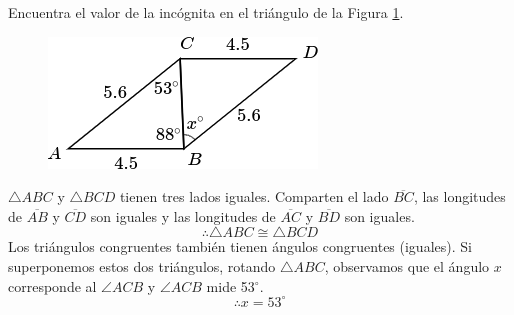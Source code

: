 Encuentra el valor de la incógnita en el triángulo de la Figura \ref{fig:angle_triangle_10}.

\begin{minipage}[t][5cm][b]{0.3\textwidth}
    \begin{figure}[H]
        \centering
        \includegraphics[width=0.99\linewidth]{../images/angle_triangle_10.png}
        \caption{}
        \label{fig:angle_triangle_10}
    \end{figure}
\end{minipage}\hfill
\begin{minipage}[t]{0.65\textwidth}
    \begin{solutionbox}{5cm}
        $\triangle ABC$ y $\triangle BCD$ tienen tres lados iguales. Comparten el lado
        $\overline{BC}$, las longitudes de $\overline{AB}$ y $\overline{CD}$ son iguales y las longitudes de
        $\overline{AC}$ y $\overline{BD}$ son iguales.
        \[\therefore \triangle ABC \cong \triangle BCD\]
        Los triángulos congruentes también tienen ángulos congruentes (iguales). Si superponemos estos dos triángulos, rotando
        $\triangle ABC$, observamos que el ángulo $x$ corresponde al
        $\angle ACB$ y $\angle ACB$ mide
        53$^\circ$.
        \[\therefore x=53^\circ\]
    \end{solutionbox}
\end{minipage}
